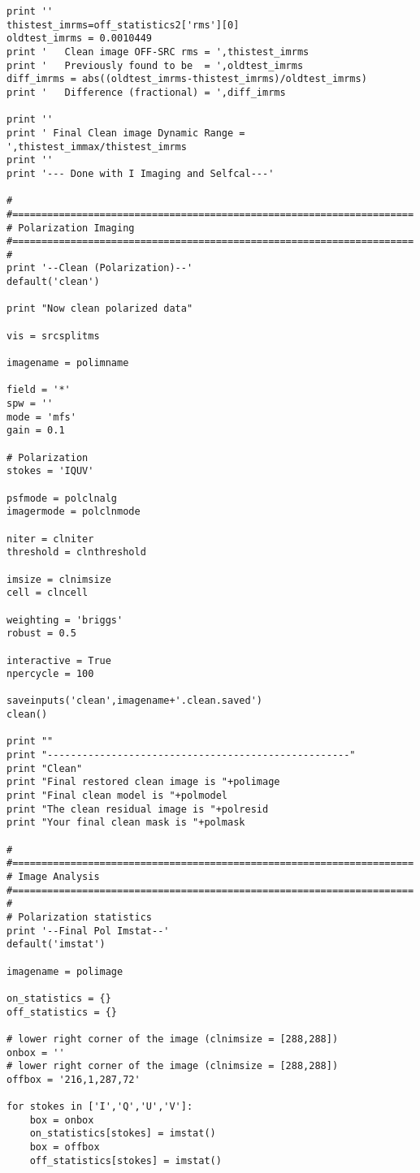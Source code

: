 \begin{verbatim}
print ''
thistest_imrms=off_statistics2['rms'][0]
oldtest_imrms = 0.0010449
print '   Clean image OFF-SRC rms = ',thistest_imrms
print '   Previously found to be  = ',oldtest_imrms
diff_imrms = abs((oldtest_imrms-thistest_imrms)/oldtest_imrms)
print '   Difference (fractional) = ',diff_imrms

print ''
print ' Final Clean image Dynamic Range = ',thistest_immax/thistest_imrms
print ''
print '--- Done with I Imaging and Selfcal---'

#
#=====================================================================
# Polarization Imaging
#=====================================================================
#
print '--Clean (Polarization)--'
default('clean')

print "Now clean polarized data"

vis = srcsplitms

imagename = polimname

field = '*'
spw = ''
mode = 'mfs'
gain = 0.1

# Polarization
stokes = 'IQUV'

psfmode = polclnalg
imagermode = polclnmode

niter = clniter
threshold = clnthreshold

imsize = clnimsize
cell = clncell

weighting = 'briggs'
robust = 0.5

interactive = True
npercycle = 100

saveinputs('clean',imagename+'.clean.saved')
clean()

print ""
print "----------------------------------------------------"
print "Clean"
print "Final restored clean image is "+polimage
print "Final clean model is "+polmodel
print "The clean residual image is "+polresid
print "Your final clean mask is "+polmask

#
#=====================================================================
# Image Analysis
#=====================================================================
#
# Polarization statistics
print '--Final Pol Imstat--'
default('imstat')

imagename = polimage

on_statistics = {}
off_statistics = {}

# lower right corner of the image (clnimsize = [288,288])
onbox = ''
# lower right corner of the image (clnimsize = [288,288])
offbox = '216,1,287,72'

for stokes in ['I','Q','U','V']:
    box = onbox
    on_statistics[stokes] = imstat()
    box = offbox
    off_statistics[stokes] = imstat()


\end{verbatim}
